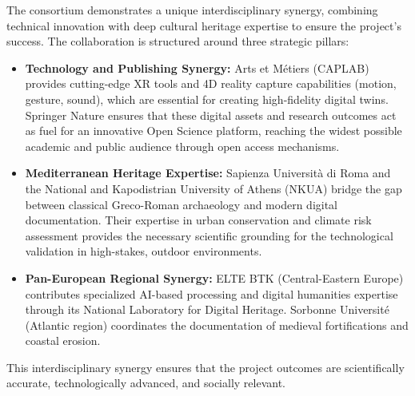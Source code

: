 The consortium demonstrates a unique interdisciplinary synergy, combining technical innovation with deep cultural heritage expertise to ensure the project’s success. The collaboration is structured around three strategic pillars:
\begin{itemize}
  \item \textbf{Technology and Publishing Synergy:} 
  Arts et Métiers (CAPLAB) provides cutting-edge XR tools and 4D reality capture capabilities (motion, gesture, sound), which are essential for creating high-fidelity digital twins. Springer Nature ensures that these digital assets and research outcomes act as fuel for an innovative Open Science platform, reaching the widest possible academic and public audience through open access mechanisms.
  \item \textbf{Mediterranean Heritage Expertise:}
  Sapienza Università di Roma and the National and Kapodistrian University of Athens (NKUA) bridge the gap between classical Greco-Roman archaeology and modern digital documentation. Their expertise in urban conservation and climate risk assessment provides the necessary scientific grounding for the technological validation in high-stakes, outdoor environments.
  \item \textbf{Pan-European Regional Synergy:} 
  ELTE BTK (Central-Eastern Europe) contributes specialized AI-based processing and digital humanities expertise through its National Laboratory for Digital Heritage. Sorbonne Université (Atlantic region) coordinates the documentation of medieval fortifications and coastal erosion.
\end{itemize}

This interdisciplinary synergy ensures that the project outcomes are scientifically accurate, technologically advanced, and socially relevant.